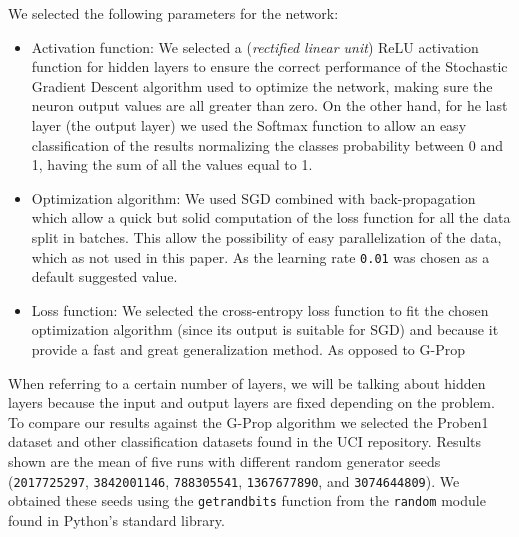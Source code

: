 \documentclass[conference]{IEEEtran}\usepackage[]{graphicx}\usepackage[]{color}
\begin{document}
We selected the following parameters for the network:

\begin{itemize}

\item Activation function: We selected a (\emph{rectified linear unit}) ReLU
  activation function for hidden layers to ensure the correct performance of
  the Stochastic Gradient Descent algorithm used to optimize the network,
  making sure the neuron output values are all greater than zero.  On the other
  hand, for he last layer (the output layer) we used the Softmax function to
  allow an easy classification of the results normalizing the classes
  probability between 0 and 1, having the sum of all the values equal to 1. %

\item Optimization algorithm: We used SGD combined with back-propagation which allow a quick but solid computation
  of the loss function for all the data split in batches. This allow the
  possibility of easy parallelization of the data, which as not used in this
  paper. As the learning rate \texttt{0.01} was chosen as a default suggested
  value.

\item Loss function: We selected the cross-entropy loss function to fit the
  chosen optimization algorithm (since its output is suitable for SGD) and
  because it provide a fast and great generalization method. As opposed to
  G-Prop

\end{itemize}

When referring to a certain number of layers, we will be talking about hidden
layers because the input and output layers are fixed depending on the problem.
To compare our results against the G-Prop algorithm we selected the Proben1
\cite{Proben1} dataset and other classification datasets found in the UCI
\cite{uci} repository. Results shown are the mean of five runs with different
random generator seeds (\texttt{2017725297}, \texttt{3842001146},
\texttt{788305541}, \texttt{1367677890}, and \texttt{3074644809}). We obtained
these seeds using the \texttt{getrandbits} function from the \texttt{random}
module found in Python's standard library.
\end{document}
